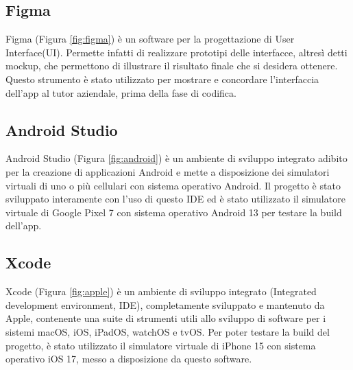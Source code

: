 \subsection{Figma}
Figma (Figura \ref{fig:figma}) è un software per la progettazione di User Interface(UI).\newline
Permette infatti di realizzare prototipi delle interfacce, altresì detti mockup, che permettono di illustrare il risultato finale che si desidera ottenere.\newline
Questo strumento è stato utilizzato per mostrare e concordare l'interfaccia dell'app al tutor aziendale, prima della fase di codifica.\newline



\subsection{Android Studio}
Android Studio (Figura \ref{fig:android}) è un ambiente di sviluppo integrato adibito per la creazione di applicazioni Android e mette a disposizione dei simulatori virtuali di uno o più cellulari con sistema operativo Android.\newline
Il progetto è stato sviluppato interamente con l'uso di questo IDE ed è stato utilizzato il simulatore virtuale di Google Pixel 7 con sistema operativo Android 13 per testare la build dell'app.\newline

\subsection{Xcode}
Xcode (Figura \ref{fig:apple}) è un ambiente di sviluppo integrato (Integrated development environment, IDE), completamente sviluppato e mantenuto da Apple, contenente una suite di strumenti utili allo sviluppo di software per i sistemi macOS, iOS, iPadOS, watchOS e tvOS.\newline
Per poter testare la build del progetto, è stato utilizzato il simulatore virtuale di iPhone 15 con sistema operativo iOS 17, messo a disposizione da questo software.\newline

